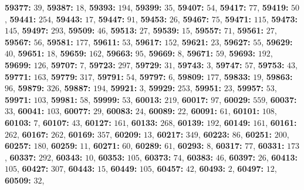 \textsf{\bfseries 59377:} $39$, \textsf{\bfseries 59387:} $18$, \textsf{\bfseries 59393:} $194$, \textsf{\bfseries 59399:} $35$, \textsf{\bfseries 59407:} $54$, \textsf{\bfseries 59417:} $77$, \textsf{\bfseries 59419:} $50$, \textsf{\bfseries 59441:} $254$, \textsf{\bfseries 59443:} $17$, \textsf{\bfseries 59447:} $91$, \textsf{\bfseries 59453:} $26$, \textsf{\bfseries 59467:} $75$, \textsf{\bfseries 59471:} $115$, \textsf{\bfseries 59473:} $145$, \textsf{\bfseries 59497:} $293$, \textsf{\bfseries 59509:} $46$, \textsf{\bfseries 59513:} $27$, \textsf{\bfseries 59539:} $15$, \textsf{\bfseries 59557:} $71$, \textsf{\bfseries 59561:} $27$, \textsf{\bfseries 59567:} $56$, \textsf{\bfseries 59581:} $177$, \textsf{\bfseries 59611:} $53$, \textsf{\bfseries 59617:} $152$, \textsf{\bfseries 59621:} $23$, \textsf{\bfseries 59627:} $55$, \textsf{\bfseries 59629:} $40$, \textsf{\bfseries 59651:} $18$, \textsf{\bfseries 59659:} $162$, \textsf{\bfseries 59663:} $95$, \textsf{\bfseries 59669:} $8$, \textsf{\bfseries 59671:} $59$, \textsf{\bfseries 59693:} $192$, \textsf{\bfseries 59699:} $126$, \textsf{\bfseries 59707:} $7$, \textsf{\bfseries 59723:} $297$, \textsf{\bfseries 59729:} $31$, \textsf{\bfseries 59743:} $3$, \textsf{\bfseries 59747:} $57$, \textsf{\bfseries 59753:} $43$, \textsf{\bfseries 59771:} $163$, \textsf{\bfseries 59779:} $317$, \textsf{\bfseries 59791:} $54$, \textsf{\bfseries 59797:} $6$, \textsf{\bfseries 59809:} $177$, \textsf{\bfseries 59833:} $19$, \textsf{\bfseries 59863:} $96$, \textsf{\bfseries 59879:} $326$, \textsf{\bfseries 59887:} $194$, \textsf{\bfseries 59921:} $3$, \textsf{\bfseries 59929:} $253$, \textsf{\bfseries 59951:} $23$, \textsf{\bfseries 59957:} $53$, \textsf{\bfseries 59971:} $103$, \textsf{\bfseries 59981:} $58$, \textsf{\bfseries 59999:} $53$, \textsf{\bfseries 60013:} $219$, \textsf{\bfseries 60017:} $97$, \textsf{\bfseries 60029:} $559$, \textsf{\bfseries 60037:} $33$, \textsf{\bfseries 60041:} $103$, \textsf{\bfseries 60077:} $29$, \textsf{\bfseries 60083:} $24$, \textsf{\bfseries 60089:} $22$, \textsf{\bfseries 60091:} $61$, \textsf{\bfseries 60101:} $108$, \textsf{\bfseries 60103:} $7$, \textsf{\bfseries 60107:} $43$, \textsf{\bfseries 60127:} $161$, \textsf{\bfseries 60133:} $268$, \textsf{\bfseries 60139:} $192$, \textsf{\bfseries 60149:} $161$, \textsf{\bfseries 60161:} $262$, \textsf{\bfseries 60167:} $262$, \textsf{\bfseries 60169:} $357$, \textsf{\bfseries 60209:} $13$, \textsf{\bfseries 60217:} $349$, \textsf{\bfseries 60223:} $86$, \textsf{\bfseries 60251:} $200$, \textsf{\bfseries 60257:} $180$, \textsf{\bfseries 60259:} $11$, \textsf{\bfseries 60271:} $60$, \textsf{\bfseries 60289:} $61$, \textsf{\bfseries 60293:} $8$, \textsf{\bfseries 60317:} $77$, \textsf{\bfseries 60331:} $173$, \textsf{\bfseries 60337:} $292$, \textsf{\bfseries 60343:} $10$, \textsf{\bfseries 60353:} $105$, \textsf{\bfseries 60373:} $74$, \textsf{\bfseries 60383:} $46$, \textsf{\bfseries 60397:} $26$, \textsf{\bfseries 60413:} $105$, \textsf{\bfseries 60427:} $307$, \textsf{\bfseries 60443:} $15$, \textsf{\bfseries 60449:} $105$, \textsf{\bfseries 60457:} $42$, \textsf{\bfseries 60493:} $2$, \textsf{\bfseries 60497:} $12$, \textsf{\bfseries 60509:} $32$, 
